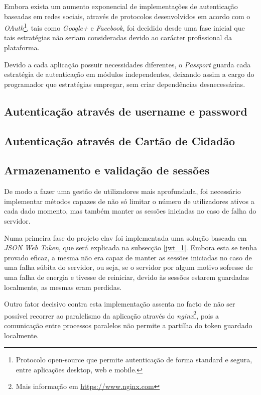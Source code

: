 Embora exista um aumento exponencial de implementações de autenticação baseadas em redes sociais, através de protocolos desenvolvidos em acordo com o \emph{OAuth}\footnote{Protocolo open-source que permite autenticação de forma standard e segura, entre aplicações desktop, web e mobile.}, tais como \emph{Google+} e \emph{Facebook}, foi decidido desde uma fase inicial que tais estratégias não seriam consideradas devido ao carácter profissional da plataforma.

Devido a cada aplicação possuir necessidades diferentes, o \emph{Passport} guarda cada estratégia de autenticação em módulos independentes, deixando assim a cargo do programador que estratégias empregar, sem criar dependências desnecessárias.

\subsection{Autenticação através de username e password}



\cleardoublepage
\subsection{Autenticação através de Cartão de Cidadão}

\cleardoublepage
\subsection{Armazenamento e validação de sessões}

De modo a fazer uma gestão de utilizadores mais aprofundada, foi necessário implementar métodos capazes de não só limitar o número de utilizadores ativos a cada dado momento, mas também manter as sessões iniciadas no caso de falha do servidor.

Numa primeira fase do projeto \gls{clav} foi implementada uma solução baseada em \emph{JSON Web Token}, que será explicada na subsecção \ref{jwt_1}. Embora esta se tenha provado eficaz, a mesma não era capaz de manter as sessões iniciadas no caso de uma falha súbita do servidor, ou seja, se o servidor por algum motivo sofresse de uma falha de energia e tivesse de reiniciar, devido às sessões estarem guardadas localmente, as mesmas eram perdidas.

Outro fator decisivo contra esta implementação assenta no facto de não ser possível recorrer ao paralelismo da aplicação através do \emph{nginx}\footnote{Mais informação em \url{https://www.nginx.com}}, pois a comunicação entre processos paralelos não permite a partilha do token guardado localmente.

